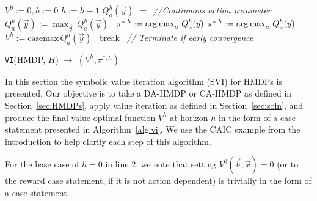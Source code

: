 \documentclass[twoside,11pt]{article}
\def\argmax{\operatornamewithlimits{arg\max}}
\newcommand{\casemax}{\mathrm{casemax}}
\begin{document}
\incmargin{.5em}
\linesnumbered
\begin{algorithm}[t!]
\dontprintsemicolon
{}
\Begin
{
   $V^0:=0, h:=0$\;
   {
       $h:=h+1$\;
       {
              $Q_a^{h}(\vec{y})\,:=\,$\;
			  \emph{//Continuous action parameter}\;
               {
               $Q_a^{h}(\vec{y}) := \max_{\vec{y}} \, Q_a^{h}(\vec{y})$ $\,$ \;
               $\pi^{*,h} := \argmax_{a} \, Q_a^{h}(\vec{y})$\;
               } 
               \Else 
               { $\pi^{*,h} := \argmax_{a} \, Q_a^{h}(\vec{y})$ \; }
        }
       $V^{h} := \casemax \, Q_a^{h}(\vec{y})$ $\,$ \;
           {break $\,$ \emph{// Terminate if early convergence}\;}
   }
      \;
}
\caption{\footnotesize \texttt{VI}(HMDP, $H$) $\longrightarrow$ $(V^h,\pi^{*,h})$ \label{alg:vi}}
\end{algorithm}
\decmargin{.5em}
In this section the symbolic value iteration algorithm (SVI) for HMDPs is presented.
Our objective is to take a DA-HMDP or CA-HMDP as defined in Section~\ref{sec:HMDPs}, apply value
iteration as defined in Section~\ref{sec:soln}, and produce
the final value optimal function $V^h$ at horizon $h$ in the form
of a case statement presented in Algorithm~\ref{alg:vi}. 
We use the \textsc{CAIC} example from the introduction to help clarify each step of this algorithm. 

For the base case of $h=0$ in line 2, we note that setting $V^0(\vec{b},\vec{x}) = 0$
(or to the reward case statement, if it is not action dependent)
is trivially in the form of a case statement.
\end{document}
